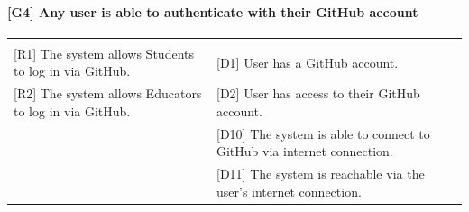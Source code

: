 \documentclass{article}
\begin{document}
\paragraph{[G4] Any user is able to authenticate with their GitHub account}
\begin{center}
\begin{tabular}{|m{20em}|m{20em}|}
\hline
& \\
{[R1]} The system allows Students to log in via GitHub. & 
{[D1]} User has a GitHub account.\\
{[R2]} The system allows Educators to log in via GitHub. & 
{[D2]} User has access to their GitHub account.\\
& {[D10]} The system is able to connect to GitHub via internet connection.\\
& {[D11]} The system is reachable via the user’s internet connection.\\
\hline
\end{tabular}
\end{center}
\end{document}
